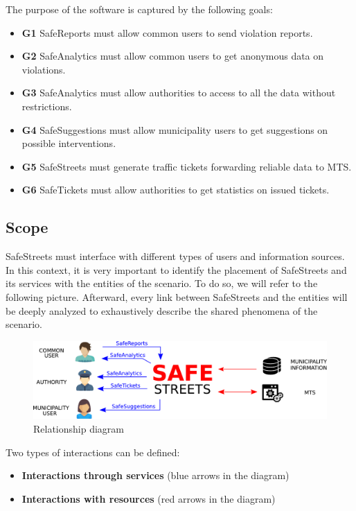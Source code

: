 \documentclass[a4paper]{article}
\begin{document}
The purpose of the software is captured by the following goals:
\begin{itemize}
\item
  \textbf{G1} SafeReports must allow common users to send violation
  reports.
\item
  \textbf{G2} SafeAnalytics must allow common users to get anonymous
  data on violations.
\item
  \textbf{G3} SafeAnalytics must allow authorities to access to all the
  data without restrictions.
\item
  \textbf{G4} SafeSuggestions must allow municipality users to get
  suggestions on possible interventions.
\item
  \textbf{G5} SafeStreets must generate traffic tickets forwarding
  reliable data to MTS.
\item
  \textbf{G6} SafeTickets must allow authorities to get statistics on
  issued tickets.
\end{itemize}

\subsection{Scope}

SafeStreets must interface with different types of users and information
sources. In this context, it is very important to identify the placement
of SafeStreets and its services with the entities of the scenario. To do
so, we will refer to the following picture. Afterward, every link
between SafeStreets and the entities will be deeply analyzed to
exhaustively describe the shared phenomena of the scenario.

\begin{figure}[H]
\centering
\includegraphics[width=\textwidth]{relationship_diagram}
\caption{Relationship diagram}
\end{figure}

Two types of interactions can be defined:
\begin{itemize}
\item
  \textbf{Interactions through services} (blue arrows in the diagram)
\item
  \textbf{Interactions with resources} (red arrows in the diagram)
\end{itemize}
\end{document}
